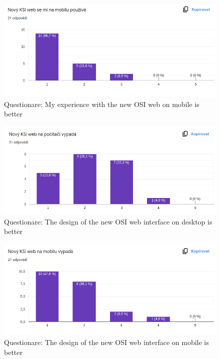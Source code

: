 \documentclass[
  digital, %
  oneside, %
  lof,     %
  lot,     %
]{fithesis4}
\begin{document}
{\begin{figure}
\includegraphics[width=\textwidth]{assets/img/questionare/mobile-ux}
\caption{Questionare: My experience with the new OSI web on mobile is better}
\label{fig:q-ux-mobile}
\end{figure}

\begin{figure}
\includegraphics[width=\textwidth]{assets/img/questionare/pc-ui}
\caption{Questionare: The design of the new OSI web interface on desktop is better}
\label{fig:q-ui-pc}
\end{figure}

\begin{figure}
\includegraphics[width=\textwidth]{assets/img/questionare/mobile-ui}
\caption{Questionare: The design of the new OSI web interface on mobile is better}
\label{fig:q-ui-mobile}
\end{figure}



}
\end{document}

